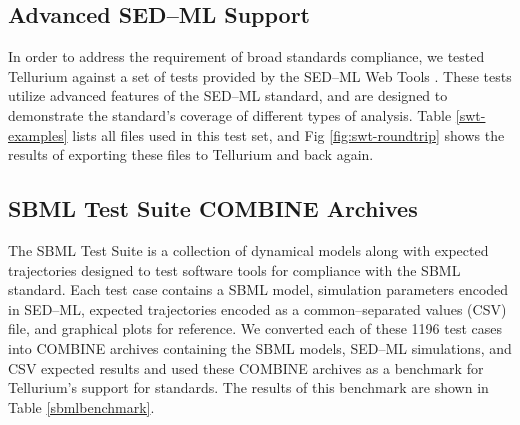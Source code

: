 \documentclass[10pt,letterpaper]{article}
\begin{document}
\subsection*{Advanced SED--ML Support}

In order to address the requirement of broad standards compliance, we tested Tellurium against a set of tests provided by the SED--ML Web Tools \cite{bergmann2017sed}. These tests utilize advanced features of the SED--ML standard, and are designed to demonstrate the standard's coverage of different types of analysis. Table \ref{swt-examples} lists all files used in this test set, and Fig \ref{fig:swt-roundtrip} shows the results of exporting these files to Tellurium and back again.

\subsection*{SBML Test Suite COMBINE Archives}

The SBML Test Suite \cite{sbmltestsuite} is a collection of dynamical models along with expected trajectories designed to test software tools for compliance with the SBML standard. Each test case contains a SBML model, simulation parameters encoded in SED--ML, expected trajectories encoded as a common--separated values (CSV) file, and graphical plots for reference. We converted each of these 1196 test cases into COMBINE archives containing the SBML models, SED--ML simulations, and CSV expected results and used these COMBINE archives as a benchmark for Tellurium's support for standards. The results of this benchmark are shown in Table \ref{sbmlbenchmark}.







\end{document}
